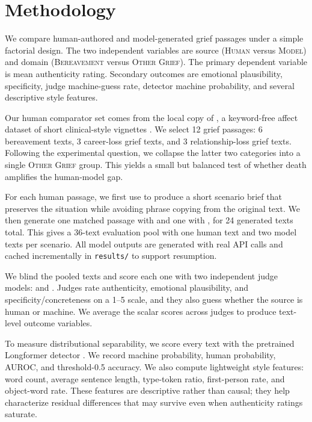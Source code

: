 \section{Methodology}
\label{sec:methodology}

We compare human-authored and model-generated grief passages under a simple factorial design. The two independent variables are source (\textsc{Human} versus \textsc{Model}) and domain (\textsc{Bereavement} versus \textsc{Other Grief}). The primary dependent variable is mean authenticity rating. Secondary outcomes are emotional plausibility, specificity, judge machine-guess rate, detector machine probability, and several descriptive style features.

Our human comparator set comes from the local copy of \aipsy, a keyword-free affect dataset of short clinical-style vignettes \citep{keeman2026aipsy}. We select 12 grief passages: 6 bereavement texts, 3 career-loss grief texts, and 3 relationship-loss grief texts. Following the experimental question, we collapse the latter two categories into a single \textsc{Other Grief} group. This yields a small but balanced test of whether death amplifies the human-model gap.

For each human passage, we first use \gptjudge to produce a short scenario brief that preserves the situation while avoiding phrase copying from the original text. We then generate one matched passage with \gptfive and one with \claudesonnet, for 24 generated texts total. This gives a 36-text evaluation pool with one human text and two model texts per scenario. All model outputs are generated with real API calls and cached incrementally in \texttt{results/} to support resumption.

We blind the pooled texts and score each one with two independent judge models: \gptjudge and \claudejudge. Judges rate authenticity, emotional plausibility, and specificity/concreteness on a 1--5 scale, and they also guess whether the source is human or machine. We average the scalar scores across judges to produce text-level outcome variables.

To measure distributional separability, we score every text with the pretrained \mage Longformer detector \citep{li2024mage}. We record machine probability, human probability, AUROC, and threshold-0.5 accuracy. We also compute lightweight style features: word count, average sentence length, type-token ratio, first-person rate, and object-word rate. These features are descriptive rather than causal; they help characterize residual differences that may survive even when authenticity ratings saturate.


